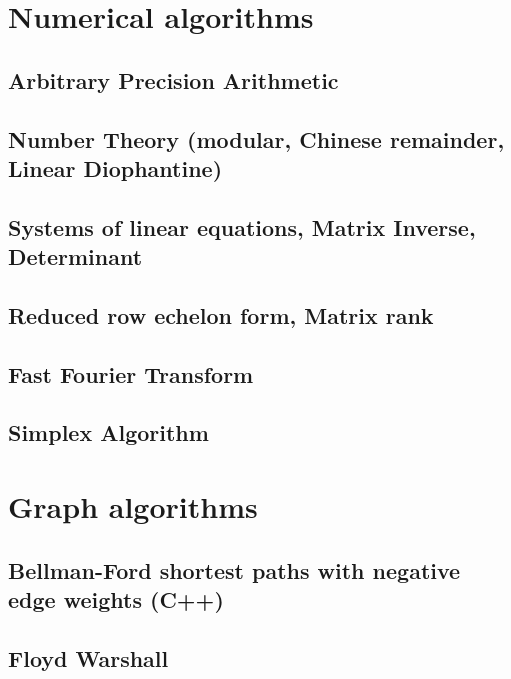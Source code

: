 \section{Numerical algorithms}
\subsection{Arbitrary Precision Arithmetic}
\raggedbottom
\hrulefill
\subsection{Number Theory (modular, Chinese remainder, Linear Diophantine)}
\raggedbottom
\hrulefill
\subsection{Systems of linear equations, Matrix Inverse, Determinant}
\raggedbottom
\hrulefill
\subsection{Reduced row echelon form, Matrix rank}
\raggedbottom
\hrulefill
\subsection{Fast Fourier Transform}
\raggedbottom
\hrulefill
\subsection{Simplex Algorithm}
\raggedbottom
\hrulefill

\section{Graph algorithms}
\subsection{Bellman-Ford shortest paths with negative edge weights (C++)}
\raggedbottom
\hrulefill
\subsection{Floyd Warshall}
\raggedbottom
\hrulefill
